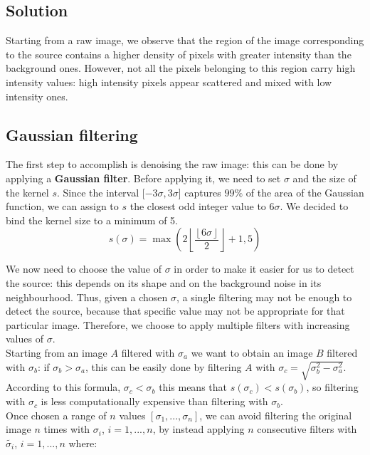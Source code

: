 \documentclass[a4paper,12pt,oneside]{book}
\begin{document}
\begin{onehalfspace}
	\chapter{Solution}
	Starting from a raw image, we observe that the region of the image corresponding to the source contains a higher density of pixels with greater intensity than the background ones. However, not all the pixels belonging to this region carry high intensity values: high intensity pixels appear scattered and mixed with low intensity ones.

	\section{Gaussian filtering}
	The first step to accomplish is denoising the raw image: this can be done by applying a \textbf{Gaussian filter}. Before applying it, we need to set $\sigma$ and the size of the kernel $s$.
	Since the interval [$-3\sigma,3\sigma$] captures $99\%$ of the area of the Gaussian function, we can assign to $s$ the closest odd integer value to $6\sigma$. We decided to bind the kernel size to a minimum of 5.
	\begin{equation}
	    s(\sigma) = \max \left( 2 \left \lfloor \frac{\left \lfloor 6\sigma \right \rfloor}{2} \right \rfloor + 1, 5 \right)
	\end{equation}
	
	We now need to choose the value of $\sigma$ in order to make it easier for us to detect the source: this depends on its shape and on the background noise in its neighbourhood. Thus, given a chosen $\sigma$, a single filtering may not be enough to detect the source, because that specific value may not be appropriate for that particular image. Therefore, we choose to apply multiple filters with increasing values of $\sigma$. \\
	Starting from an image $A$ filtered with $\sigma_{a}$ we want to obtain an image $B$ filtered with $\sigma_{b}$: if $\sigma_{b} > \sigma_{a}$, this can be easily done by filtering $A$ with $\sigma_{c} = \sqrt{\sigma_{b}^2 - \sigma_{a}^2}$. According to this formula, $\sigma_{c} < \sigma_{b}$ this means that $s(\sigma_{c}) < s(\sigma_{b})$, so filtering with $\sigma_{c}$ is less computationally expensive than filtering with $\sigma_{b}$. \\ 
    Once chosen a range of $n$ values $[\sigma_{1}, ..., \sigma_{n}]$, we can avoid filtering the original image $n$ times with $\sigma_{i}$, $i = 1, ..., n$, by instead applying $n$ consecutive filters with $\tilde{\sigma_{i}}$, $i = 1, ..., n$ where:
    

\end{onehalfspace}
\end{document}
